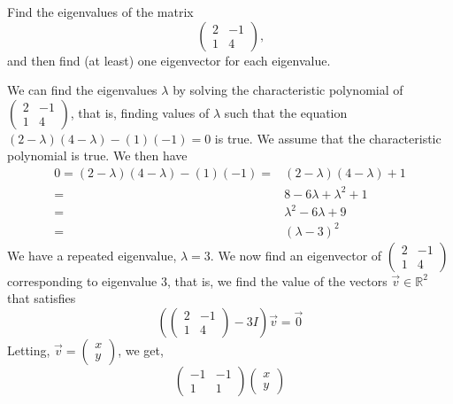 \documentclass[12pt]{article}
\newenvironment{problem}[2][Problem]
{
	\begin{trivlist} 
		\item[\hskip \labelsep {\bfseries #1 #2:}]
	}
{
	\end{trivlist}
	}
\newenvironment{solution}[1][Solution]
{
	\begin{trivlist} 
		\item[\hskip \labelsep {\itshape #1:}]
	}
	{
	\end{trivlist}
}
\begin{document}
\begin{problem}{2}
\begin{solution}
\end{solution}
\end{problem}






\newpage
\begin{problem}{3}
Find the eigenvalues of the matrix
\[
\begin{pmatrix}2&-1\\1&4\end{pmatrix} \text{,}
\]
and then find (at least) one eigenvector for each eigenvalue.
\noindent
\newline
\newline
\begin{solution}
We can find the eigenvalues $\lambda$ by solving the characteristic polynomial of $\begin{pmatrix}2&-1\\1&4\end{pmatrix}$, that is, finding values of $\lambda$ such that the equation $(2-\lambda)(4-\lambda) - (1)(-1) = 0$ is true. We assume that the characteristic polynomial is true. We then have
\begin{align*}
0=(2-\lambda)(4-\lambda) - (1)(-1)=& (2-\lambda)(4-\lambda) +1 \\
=& 8-6 \lambda + \lambda ^2 +1\\
=& \lambda ^2 -6 \lambda +9\\
=& (\lambda - 3)^2
\end{align*}
We have a repeated eigenvalue, $\lambda = 3$. We now find an eigenvector of $\begin{pmatrix}2&-1\\1&4\end{pmatrix}$ corresponding to eigenvalue $3$, that is, we find the value of the vectors $\vec{v} \in \mathbb{R}^2$ that satisfies
\[
\left( \begin{pmatrix}2&-1\\1&4\end{pmatrix} - 3I \right) \vec{v} = \vec{0}
\]
Letting, $\vec{v}=\begin{pmatrix} x\\y\end{pmatrix}$, we get,
\[
\begin{pmatrix}-1&-1\\1&1\end{pmatrix} \begin{pmatrix} x\\y\end{pmatrix} %
\]
\end{solution}
\end{problem}
\end{document}

